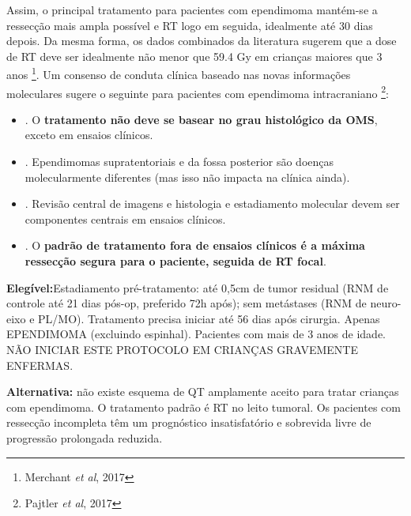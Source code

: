 \documentclass[11pt,a4paper,oldfontcommands]{memoir}
\begin{document}
{Assim, o principal tratamento para pacientes com ependimoma mantém-se a ressecção mais ampla possível e RT logo em seguida, idealmente até 30 dias depois. Da mesma forma, os dados combinados da literatura sugerem que a dose de RT deve ser idealmente não menor que 59.4 Gy em crianças maiores que 3 anos \footnote{Merchant \textit{et al}, 2017}. Um consenso de conduta clínica baseado nas novas informações moleculares sugere o seguinte para pacientes com ependimoma intracraniano \footnote{Pajtler \textit{et al}, 2017}:
\begin{itemize}
\item[1]. O \textbf{tratamento não deve se basear no grau histológico da OMS}, exceto em ensaios clínicos.
\item[2]. Ependimomas supratentoriais e da fossa posterior são doenças molecularmente diferentes (mas isso não impacta na clínica ainda).
\item[3]. Revisão central de imagens e histologia e estadiamento molecular devem ser componentes centrais em ensaios clínicos.
\item[4]. O \textbf{padrão de tratamento fora de ensaios clínicos é a máxima ressecção segura para o paciente, seguida de RT focal}. 
\end{itemize}

\textbf{Elegível:}Estadiamento pré-tratamento: até 0,5cm de tumor residual (RNM de controle até 21 dias pós-op, preferido 72h após); sem metástases (RNM de neuro-eixo e PL/MO). Tratamento precisa iniciar até 56 dias após cirurgia. Apenas EPENDIMOMA (excluindo espinhal). Pacientes com mais de 3 anos de idade. NÃO INICIAR ESTE PROTOCOLO EM CRIANÇAS GRAVEMENTE ENFERMAS.

\textbf{Alternativa:} não existe esquema de QT amplamente aceito para tratar crianças com ependimoma. O tratamento padrão é RT no leito tumoral. Os pacientes com ressecção incompleta têm um prognóstico insatisfatório e sobrevida livre de progressão prolongada reduzida.}
\end{document}
